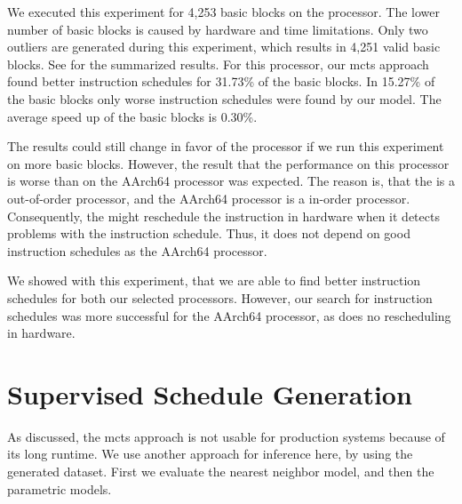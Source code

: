 We executed this experiment for 4,253 basic blocks on the \aurora processor.
The lower number of basic blocks is caused by hardware and time limitations.
Only two outliers are generated during this experiment, which results in 4,251 valid basic blocks.
See  for the summarized results.
For this processor, our \ac{mcts} approach found better instruction schedules for 31.73\% of the basic blocks.
In 15.27\% of the basic blocks only worse instruction schedules were found by our model.
The average speed up of the basic blocks is 0.30\%.

The results could still change in favor of the \aurora processor if we run this experiment on more basic blocks.
However, the result that the performance on this processor is worse than on the AArch64 processor was expected.
The reason is, that the \aurora is a out-of-order processor, and the AArch64 processor is a in-order processor.
Consequently, the \aurora might reschedule the instruction in hardware when it detects problems with the instruction schedule.
Thus, it does not depend on good instruction schedules as the AArch64 processor.

We showed with this experiment, that we are able to find better instruction schedules for both our selected processors.
However, our search for instruction schedules was more successful for the AArch64 processor, as does no rescheduling in hardware.

\section{Supervised Schedule Generation}
\label{sec:eval:supervised}
As discussed, the \ac{mcts} approach is not usable for production systems because of its long runtime.
We use another approach for inference here, by using the generated dataset.
First we evaluate the nearest neighbor model, and then the parametric models.

